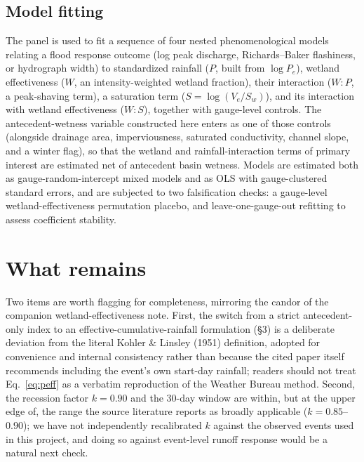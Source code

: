 \documentclass[11pt]{article}
\begin{document}
\subsection{Model fitting}
The panel is used to fit a sequence of four nested phenomenological models relating a flood
response outcome (log peak discharge, Richards--Baker flashiness, or hydrograph width) to
standardized rainfall ($P$, built from $\log P_e$), wetland effectiveness ($W$, an
intensity-weighted wetland fraction), their interaction ($W{:}P$, a peak-shaving term), a
saturation term ($S = \log(V_e/S_w)$), and its interaction with wetland effectiveness
($W{:}S$), together with gauge-level controls. The antecedent-wetness variable constructed here
enters as one of those controls (alongside drainage area, imperviousness, saturated conductivity,
channel slope, and a winter flag), so that the wetland and rainfall-interaction terms of primary
interest are estimated net of antecedent basin wetness. Models are estimated both as
gauge-random-intercept mixed models and as OLS with gauge-clustered standard errors, and are
subjected to two falsification checks: a gauge-level wetland-effectiveness permutation placebo,
and leave-one-gauge-out refitting to assess coefficient stability.

\section{What remains}

Two items are worth flagging for completeness, mirroring the candor of the companion
wetland-effectiveness note. First, the switch from a strict antecedent-only index to an
effective-cumulative-rainfall formulation (\S3) is a deliberate deviation from the literal
Kohler \& Linsley (1951) definition, adopted for convenience and internal consistency rather than
because the cited paper itself recommends including the event's own start-day rainfall; readers
should not treat Eq.~\eqref{eq:peff} as a verbatim reproduction of the Weather Bureau method.
Second, the recession factor $k=0.90$ and the 30-day window are within, but at the upper edge of,
the range the source literature reports as broadly applicable ($k=0.85$--$0.90$); we have not
independently recalibrated $k$ against the observed events used in this project, and doing so
against event-level runoff response would be a natural next check.
\end{document}
